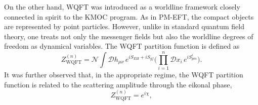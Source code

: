 On the other hand, WQFT was introduced as a worldline framework closely connected in spirit to the KMOC program. As in PM-EFT, the compact objects are represented by point particles. However, unlike in standard quantum field theory, one treats not only the messenger fields but also the worldline degrees of freedom as dynamical variables. The WQFT partition function is defined as
\begin{equation}
    Z_{\textrm{WQFT}}^{(n)}
    =
    \mathcal{N}
    \int \mathcal{D}h_{\mu\nu}\,
    e^{iS_{EH}+iS_{gf}}
    \Big(\prod_{i=1}^{n}\mathcal{D}x_i\,e^{iS_{pm}^i}\Big).
\end{equation}
It was further observed that, in the appropriate regime, the WQFT partition function is related to the scattering amplitude through the eikonal phase,
\begin{equation}
    Z_{\textrm{WQFT}}^{(n)}=e^{i\chi},
\end{equation}
